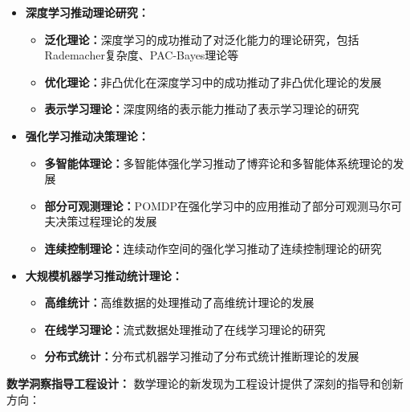 \begin{itemize}
\item \textbf{深度学习推动理论研究：}
\begin{itemize}
\item \textbf{泛化理论：}深度学习的成功推动了对泛化能力的理论研究，包括Rademacher复杂度、PAC-Bayes理论等
\item \textbf{优化理论：}非凸优化在深度学习中的成功推动了非凸优化理论的发展
\item \textbf{表示学习理论：}深度网络的表示能力推动了表示学习理论的研究
\end{itemize}

\item \textbf{强化学习推动决策理论：}
\begin{itemize}
\item \textbf{多智能体理论：}多智能体强化学习推动了博弈论和多智能体系统理论的发展
\item \textbf{部分可观测理论：}POMDP在强化学习中的应用推动了部分可观测马尔可夫决策过程理论的发展
\item \textbf{连续控制理论：}连续动作空间的强化学习推动了连续控制理论的研究
\end{itemize}

\item \textbf{大规模机器学习推动统计理论：}
\begin{itemize}
\item \textbf{高维统计：}高维数据的处理推动了高维统计理论的发展
\item \textbf{在线学习理论：}流式数据处理推动了在线学习理论的研究
\item \textbf{分布式统计：}分布式机器学习推动了分布式统计推断理论的发展
\end{itemize}
\end{itemize}

\textbf{数学洞察指导工程设计：}
数学理论的新发现为工程设计提供了深刻的指导和创新方向：

